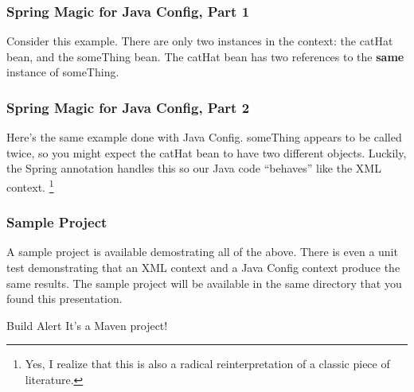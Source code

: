 \documentclass[t,handout]{beamer}
\begin{document}
        \frame
        {
            \frametitle{Spring Magic for Java Config, Part 1}
            Consider this example.  There are only two instances in the context:
            the catHat bean, and the someThing bean.  The catHat bean has two
            references to the \textbf{same} instance of someThing.
            {\tiny 
                
            }
        }

        \frame
        {
            \frametitle{Spring Magic for Java Config, Part 2}
            Here's the same example done with Java Config.  someThing appears
            to be called twice, so you might expect the catHat bean to have
            two different objects.  Luckily, the Spring annotation handles this
            so our Java code ``behaves'' like the XML context.
            \footnote[frame]{\tiny{Yes, I realize that this is also a radical 
            reinterpretation of a classic piece of literature.}}
            
            {\tiny 
                
            }
        }
        
        \frame
        {
            \frametitle{Sample Project}
            
            A sample project is available demostrating all of the above.  There
            is even a unit test demonstrating that an XML context and a Java
            Config context produce the same results.  The sample project will
            be available in the same directory that you found this presentation.
            
            \begin{alertblock}{Build Alert}
                It's a Maven project!
            \end{alertblock}
        }
\end{document}
